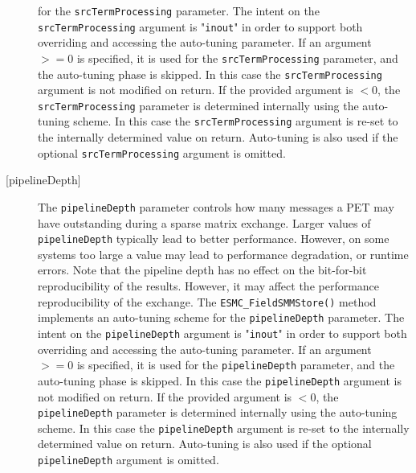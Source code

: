 \begin{description}
      for the {\tt srcTermProcessing} parameter. The intent on the
      {\tt srcTermProcessing} argument is "{\tt inout}" in order to
      support both overriding and accessing the auto-tuning parameter.
      If an argument $>= 0$ is specified, it is used for the
      {\tt srcTermProcessing} parameter, and the auto-tuning phase is skipped.
      In this case the {\tt srcTermProcessing} argument is not modified on
      return. If the provided argument is $< 0$, the {\tt srcTermProcessing}
      parameter is determined internally using the auto-tuning scheme. In this
      case the {\tt srcTermProcessing} argument is re-set to the internally
      determined value on return. Auto-tuning is also used if the optional
      {\tt srcTermProcessing} argument is omitted.
    \item [{[pipelineDepth]}]
      The {\tt pipelineDepth} parameter controls how many messages a PET
      may have outstanding during a sparse matrix exchange. Larger values
      of {\tt pipelineDepth} typically lead to better performance. However,
      on some systems too large a value may lead to performance degradation,
      or runtime errors.
      Note that the pipeline depth has no effect on the bit-for-bit
      reproducibility of the results. However, it may affect the performance
      reproducibility of the exchange.
      The {\tt ESMC\_FieldSMMStore()} method implements an auto-tuning scheme
      for the {\tt pipelineDepth} parameter. The intent on the
      {\tt pipelineDepth} argument is "{\tt inout}" in order to
      support both overriding and accessing the auto-tuning parameter.
      If an argument $>= 0$ is specified, it is used for the
      {\tt pipelineDepth} parameter, and the auto-tuning phase is skipped.
      In this case the {\tt pipelineDepth} argument is not modified on
      return. If the provided argument is $< 0$, the {\tt pipelineDepth}
      parameter is determined internally using the auto-tuning scheme. In this
      case the {\tt pipelineDepth} argument is re-set to the internally
      determined value on return. Auto-tuning is also used if the optional
      {\tt pipelineDepth} argument is omitted.
    \end{description}
  
\setlength{\parskip}{\oldparskip}
\setlength{\parindent}{\oldparindent}
\setlength{\baselineskip}{\oldbaselineskip}
